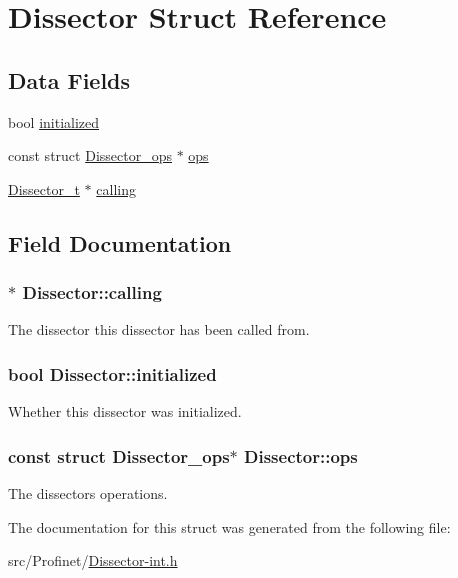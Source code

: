 \hypertarget{struct_dissector}{\section{Dissector Struct Reference}
\label{struct_dissector}
}
\subsection*{Data Fields}
\begin{DoxyCompactItemize}
\item 
bool \hyperlink{struct_dissector_a86386b01b6edc229f64d438929d92a4f}{initialized}
\item 
const struct \hyperlink{struct_dissector__ops}{Dissector\-\_\-ops} $\ast$ \hyperlink{struct_dissector_a2786b3015a49f746ecbbc33840838a4e}{ops}
\item 
\hyperlink{struct_dissector}{Dissector\-\_\-t} $\ast$ \hyperlink{struct_dissector_a9c793579ef8c1fa11c26a0d146bc2f2c}{calling}
\end{DoxyCompactItemize}


\subsection{Field Documentation}
\hypertarget{struct_dissector_a9c793579ef8c1fa11c26a0d146bc2f2c}{
\subsubsection[{calling}]{$\ast$ Dissector\-::calling}}\label{struct_dissector_a9c793579ef8c1fa11c26a0d146bc2f2c}
The dissector this dissector has been called from. \hypertarget{struct_dissector_a86386b01b6edc229f64d438929d92a4f}{
\subsubsection[{initialized}]{\setlength{\rightskip}{0pt plus 5cm}bool Dissector\-::initialized}}\label{struct_dissector_a86386b01b6edc229f64d438929d92a4f}
Whether this dissector was initialized. \hypertarget{struct_dissector_a2786b3015a49f746ecbbc33840838a4e}{
\subsubsection[{ops}]{\setlength{\rightskip}{0pt plus 5cm}const struct {\bf Dissector\-\_\-ops}$\ast$ Dissector\-::ops}}\label{struct_dissector_a2786b3015a49f746ecbbc33840838a4e}
The dissectors operations. 

The documentation for this struct was generated from the following file\-:\begin{DoxyCompactItemize}
\item 
src/\-Profinet/\hyperlink{_dissector-int_8h}{Dissector-\/int.\-h}\end{DoxyCompactItemize}
